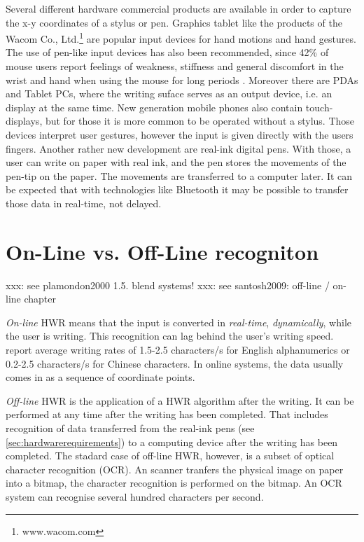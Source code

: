 Several different hardware commercial products are available in order to
capture the x-y coordinates of a stylus or pen. Graphics tablet like the
products of the Wacom Co., Ltd.\footnote{www.wacom.com} are popular input
devices for hand motions and hand gestures. The use of pen-like input devices 
has also been recommended, since 42\% of mouse users report feelings of 
weakness, stiffness and general discomfort in the wrist and hand when 
using the mouse for long periods . Moreover there are
PDAs and Tablet PCs, where the writing suface serves as an output device,
i.e. an display at the same time. New generation mobile phones also contain
touch-displays, but for those it is more common to be operated without a 
stylus. Those devices interpret user gestures, however the input is given 
directly with the users fingers. Another rather new development are real-ink 
digital pens. With those, a user can write on paper with real ink, and the pen
stores the movements of the pen-tip on the paper. The movements are transferred 
to a computer later. It can be expected that with technologies like Bluetooth
it may be possible to transfer those data in real-time, not delayed.

\section{On-Line vs. Off-Line recogniton}
\label{sec:onlinevsoffline}

xxx: see plamondon2000 1.5. blend systems!
xxx: see santosh2009: off-line / on-line chapter

\emph{On-line} HWR means that the input is converted in \emph{real-time}, 
\emph{dynamically}, while the user is writing. This recognition can lag behind
the user's writing speed.  report average writing rates 
of 1.5-2.5 characters/s for English alphanumerics or 0.2-2.5 characters/s for 
Chinese characters. In online systems, the data usually comes in as a sequence 
of coordinate points.

\emph{Off-line} HWR is the application of a HWR algorithm after the writing.
It can be performed at any time after the writing has been completed. That 
includes recognition of data transferred from the real-ink pens 
(see \ref{sec:hardwarerequirements}) to a computing device after the writing
has been completed. The stadard case of off-line HWR, however, is a subset of
optical character recognition (OCR). An scanner tranfers the physical image 
on paper into a bitmap, the character recognition is performed on the bitmap.
An OCR system can recognise several hundred characters per second.

